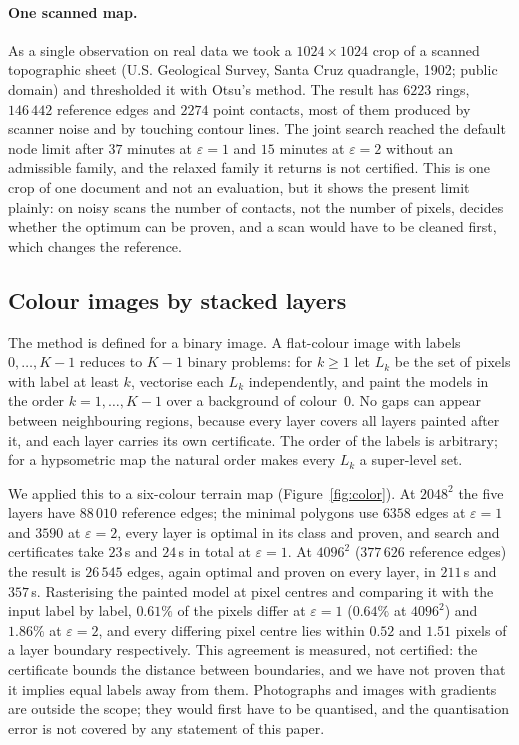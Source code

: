 \documentclass[11pt,a4paper]{article}
\theoremstyle{definition}
\theoremstyle{remark}
\begin{document}
\paragraph{One scanned map.} As a single observation on real data we took
a $1024\times1024$ crop of a scanned topographic sheet (U.S. Geological
Survey, Santa Cruz quadrangle, 1902; public domain) and thresholded it with
Otsu's method. The result has $6223$ rings, $146\,442$ reference edges and
$2274$ point contacts, most of them produced by scanner noise and by
touching contour lines. The joint search reached the default node limit
after $37$ minutes at $\varepsilon=1$ and $15$ minutes at $\varepsilon=2$
without an admissible family, and the relaxed family it returns is not
certified. This is one crop of one document and not an evaluation, but it
shows the present limit plainly: on noisy scans the number of contacts, not
the number of pixels, decides whether the optimum can be proven, and a scan
would have to be cleaned first, which changes the reference.

\subsection{Colour images by stacked layers}\label{sec:color}

The method is defined for a binary image. A flat-colour image with labels
$0,\dots,K-1$ reduces to $K-1$ binary problems: for $k\ge1$ let
$L_k$ be the set of pixels with label at least $k$, vectorise each $L_k$
independently, and paint the models in the order $k=1,\dots,K-1$ over a
background of colour~$0$. No gaps can appear between neighbouring regions,
because every layer covers all layers painted after it, and each layer
carries its own certificate. The order of the labels is arbitrary; for a
hypsometric map the natural order makes every $L_k$ a super-level set.

We applied this to a six-colour terrain map
(Figure~\ref{fig:color}). At $2048^2$ the five layers have $88\,010$
reference edges; the minimal polygons use $6358$ edges at $\varepsilon=1$ and
$3590$ at $\varepsilon=2$, every layer is optimal in its class and proven,
and search and certificates take $23$\,s and $24$\,s in total at
$\varepsilon=1$. At $4096^2$ ($377\,626$ reference edges) the result is
$26\,545$ edges, again optimal and proven on every layer, in $211$\,s and
$357$\,s. Rasterising the painted model at pixel centres and comparing it
with the input label by label, $0.61\%$ of the pixels differ at
$\varepsilon=1$ ($0.64\%$ at $4096^2$) and $1.86\%$ at $\varepsilon=2$, and
every differing pixel centre lies within $0.52$ and $1.51$ pixels of a layer
boundary respectively. This agreement is measured, not certified: the
certificate bounds the distance between boundaries, and we have not proven
that it implies equal labels away from them. Photographs and images with
gradients are outside the scope; they would first have to be quantised, and
the quantisation error is not covered by any statement of this paper.
\end{document}

